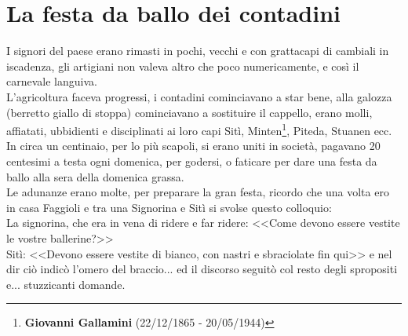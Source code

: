 
\chapter{La festa da ballo dei contadini}
I signori del paese erano rimasti in pochi, vecchi e con grattacapi di cambiali in iscadenza, gli artigiani non valeva altro che poco numericamente, e così il carnevale languiva. \\
\indent L'agricoltura faceva progressi, i contadini cominciavano a star bene, alla galozza (berretto giallo di stoppa) cominciavano a sostituire il cappello, erano molli, affiatati, ubbidienti e disciplinati ai loro capi Sitì, Minten\footnote{\textbf{Giovanni Gallamini} (22/12/1865 - 20/05/1944)}, Piteda, Stuanen ecc.\\
\indent In circa un centinaio, per lo più scapoli, si erano uniti in società, pagavano 20 centesimi a testa ogni domenica, per godersi, o faticare per dare una festa da ballo alla sera della domenica grassa. \\
\indent Le adunanze erano molte, per preparare la gran festa, ricordo che una volta ero in casa Faggioli e tra una Signorina e Sitì si svolse questo colloquio:\\
\indent La signorina, che era in vena di ridere e far ridere: <<Come devono essere vestite le vostre ballerine?>>\\
\indent Sitì: <<Devono essere vestite di bianco, con nastri e sbraciolate fin qui>> e nel dir ciò indicò l'omero del braccio... ed il discorso seguitò col resto degli spropositi e... stuzzicanti domande.\\

